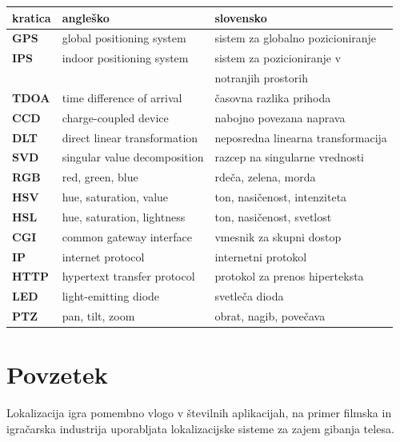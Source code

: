 \documentclass[a4paper, 12pt]{book}
\newcommand{\clearemptydoublepage}{\newpage{\pagestyle{empty}\cleardoublepage}}
\begin{document}
\begin{tabular}{l|l|l}
  {\bf kratica} & {\bf angleško} & {\bf slovensko} \\ \hline
  {\bf GPS} & global positioning system & sistem za globalno pozicioniranje \\
  {\bf IPS} & indoor positioning system & sistem za pozicioniranje v \\
  			& 							& notranjih prostorih \\
  {\bf TDOA} & time difference of arrival & časovna razlika prihoda \\
  {\bf CCD} & charge-coupled device & nabojno povezana naprava \\
  {\bf DLT} & direct linear transformation & neposredna linearna transformacija \\
  {\bf SVD} & singular value decomposition & razcep na singularne vrednosti \\
  {\bf RGB} & red, green, blue & rdeča, zelena, morda \\
  {\bf HSV} & hue, saturation, value & ton, nasičenost, intenziteta \\
  {\bf HSL} & hue, saturation, lightness & ton, nasičenost, svetlost \\
  {\bf CGI} & common gateway interface & vmesnik za skupni dostop \\
  {\bf IP} & internet protocol & internetni protokol \\
  {\bf HTTP} & hypertext transfer protocol & protokol za prenos hiperteksta \\
  {\bf LED} & light-emitting diode & svetleča dioda \\
  {\bf PTZ} & pan, tilt, zoom & obrat, nagib, povečava \\
\end{tabular}



\clearemptydoublepage

\chapter*{Povzetek}
Lokalizacija igra pomembno vlogo v številnih aplikacijah, na primer filmska in igračarska industrija uporabljata lokalizacijske sisteme za zajem gibanja telesa.
\end{document}
